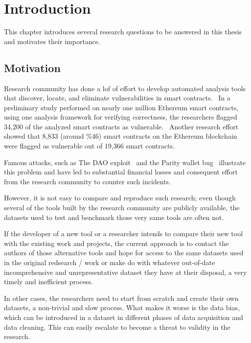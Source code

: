 \chapter{Introduction}

  This chapter introduces several research questions to be answered in this thesis and motivates their importance.

\section{Motivation}
  Research community has done a lof of effort to develop automated analysis tools~\cite{ref_tools} that discover, locate, and eliminate vulnerabilities in smart contracts.~\cite{ref_tools}
  In a preliminary study performed on nearly one million Ethereum smart contracts, using one analysis framework for verifying correctness, the researchers flagged 34,200 of the analyzed smart contracts as vulnerable.~\cite{ref_flag1}
  Another research effort showed that 8,833 (around \%46) smart contracts on the Ethereum blockchain were flagged as vulnerable out of 19,366 smart contracts.~\cite{ref_flag2}
  
  Famous attacks, such as The DAO exploit~\cite{dao} and the Parity wallet bug~\cite{ref_parity} illustrate this problem and have led to substantial financial losses and consequent effort from the research community to counter such incidents.

  However, it is not easy to compare and reproduce such research; even though several of the tools built by the research community are publicly available, the datasets used to test and benchmark those very same tools are often not.

  If the developer of a new tool or a researcher intends to compare their new tool with the existing work and projects, the current approach is to contact the authors of those alternative tools and hope for access to the same datasets used in the original redsearch / work or make do with whatever out-of-date incomprehensive and unrepresentative dataset they have at their disposal, a very timely and inefficient process.

  In other cases, the researchers need to start from scratch and create their own datasets, a non-trivial and slow process.
  What makes it worse is the data bias, which can be introduced in a dataset in different phases of data acquisition and data cleaning.
  This can easily escalate to become a threat to validity in the research.~\cite{Empirical-Evaluation-of-Smart-Contract-Testing:What-is-the-Best-Choice}

